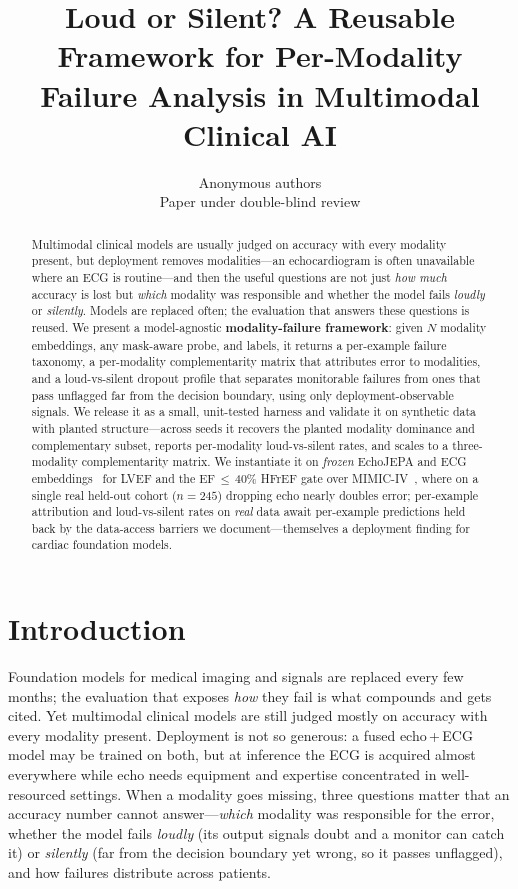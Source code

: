 \documentclass{article}
\title{Loud or Silent? A Reusable Framework for Per-Modality\\
Failure Analysis in Multimodal Clinical AI}
\author{Anonymous authors\\Paper under double-blind review}
\begin{document}
\maketitle

\begin{abstract}
Multimodal clinical models are usually judged on accuracy with every modality present, but
deployment removes modalities---an echocardiogram is often unavailable where an ECG is
routine---and then the useful questions are not just \emph{how much} accuracy is lost but
\emph{which} modality was responsible and whether the model fails \emph{loudly} or
\emph{silently}. Models are replaced often; the evaluation that answers these questions is reused.
We present a model-agnostic \textbf{modality-failure framework}: given $N$ modality embeddings,
any mask-aware probe, and labels, it returns a per-example failure taxonomy, a per-modality
complementarity matrix that attributes error to modalities, and a loud-vs-silent dropout profile
that separates monitorable failures from ones that pass unflagged far from the decision boundary, using only deployment-observable
signals. We release it as a small, unit-tested harness and validate it on synthetic data with
planted structure---across seeds it recovers the planted modality dominance and complementary
subset, reports per-modality loud-vs-silent rates, and scales to a three-modality complementarity
matrix. We instantiate it on \emph{frozen} EchoJEPA and ECG
embeddings~\citep{echojepa,vjepa2,hubertecg} for LVEF and the \mbox{EF\,$\leq$\,40\%} HFrEF gate over
MIMIC-IV~\citep{mimiciv,johnson2023mimiciv}, where on a single real held-out cohort (\mbox{$n=245$}) dropping echo nearly
doubles error; per-example attribution and loud-vs-silent rates on \emph{real} data await
per-example predictions held back by the data-access barriers we document---themselves a deployment
finding for cardiac foundation models.
\end{abstract}

\section{Introduction}
\label{sec:intro}
Foundation models for medical imaging and signals are replaced every few months; the evaluation
that exposes \emph{how} they fail is what compounds and gets cited. Yet multimodal clinical models
are still judged mostly on accuracy with every modality present. Deployment is not so generous: a
fused echo\,+\,ECG model may be trained on both, but at inference the ECG is acquired almost
everywhere while echo needs equipment and expertise concentrated in well-resourced settings. When a
modality goes missing, three questions matter that an accuracy number cannot answer---\emph{which}
modality was responsible for the error, whether the model fails \emph{loudly} (its output signals
doubt and a monitor can catch it) or \emph{silently} (far from the decision boundary yet wrong, so it passes unflagged), and how failures
distribute across patients.
\end{document}
